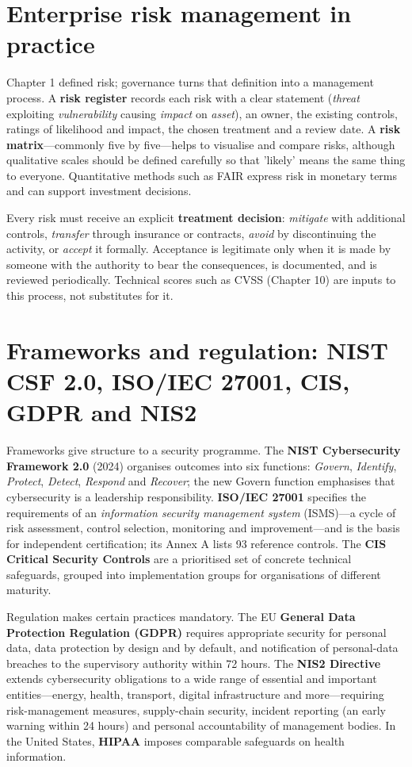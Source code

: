 \section{Enterprise risk management in practice}\label{sec:13.3}
Chapter 1 defined risk; governance turns that definition into a management process. A \textbf{risk register} records each risk with a clear statement (\emph{threat} exploiting \emph{vulnerability} causing \emph{impact} on \emph{asset}), an owner, the existing controls, ratings of likelihood and impact, the chosen treatment and a review date. A \textbf{risk matrix}—commonly five by five—helps to visualise and compare risks, although qualitative scales should be defined carefully so that 'likely' means the same thing to everyone. Quantitative methods such as FAIR express risk in monetary terms and can support investment decisions.

Every risk must receive an explicit \textbf{treatment decision}: \emph{mitigate} with additional controls, \emph{transfer} through insurance or contracts, \emph{avoid} by discontinuing the activity, or \emph{accept} it formally. Acceptance is legitimate only when it is made by someone with the authority to bear the consequences, is documented, and is reviewed periodically. Technical scores such as CVSS (Chapter 10) are inputs to this process, not substitutes for it.

\section{Frameworks and regulation: NIST CSF 2.0, ISO/IEC 27001, CIS, GDPR and NIS2}\label{sec:13.4}
Frameworks give structure to a security programme. The \textbf{NIST Cybersecurity Framework 2.0} (2024) organises outcomes into six functions: \emph{Govern}, \emph{Identify}, \emph{Protect}, \emph{Detect}, \emph{Respond} and \emph{Recover}; the new Govern function emphasises that cybersecurity is a leadership responsibility. \textbf{ISO/IEC 27001} specifies the requirements of an \emph{information security management system} (ISMS)—a cycle of risk assessment, control selection, monitoring and improvement—and is the basis for independent certification; its Annex A lists 93 reference controls. The \textbf{CIS Critical Security Controls} are a prioritised set of concrete technical safeguards, grouped into implementation groups for organisations of different maturity.

Regulation makes certain practices mandatory. The EU \textbf{General Data Protection Regulation (GDPR)} requires appropriate security for personal data, data protection by design and by default, and notification of personal-data breaches to the supervisory authority within 72 hours. The \textbf{NIS2 Directive} extends cybersecurity obligations to a wide range of essential and important entities—energy, health, transport, digital infrastructure and more—requiring risk-management measures, supply-chain security, incident reporting (an early warning within 24 hours) and personal accountability of management bodies. In the United States, \textbf{HIPAA} imposes comparable safeguards on health information.

